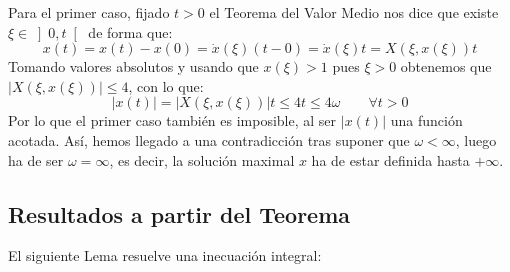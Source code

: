 \begin{ejemplo}
    \noindent
    Para el primer caso, fijado $t>0$ el Teorema del Valor Medio nos dice que existe $\xi \in \left]0,t\right[$ de forma que:
    \begin{equation*}
        x(t) = x(t) - x(0) = \dot{x}(\xi)(t-0) = \dot{x}(\xi) t = X(\xi,x(\xi)) t
    \end{equation*}
    Tomando valores absolutos y usando que $x(\xi)>1$ pues $\xi >0$ obtenemos que $|X(\xi,x(\xi))| \leq 4$, con lo que:
    \begin{equation*}
        |x(t)| = |X(\xi,x(\xi))|t \leq 4t \leq 4\omega \qquad \forall t>0
    \end{equation*}
    Por lo que el primer caso también es imposible, al ser $|x(t)|$ una función acotada. Así, hemos llegado a una contradicción tras suponer que $\omega<\infty$, luego ha de ser $\omega = \infty$, es decir, la solución maximal $x$ ha de estar definida hasta $+\infty$.
\end{ejemplo}

\subsection{Resultados a partir del Teorema}
\noindent
El siguiente Lema resuelve una inecuación integral:

